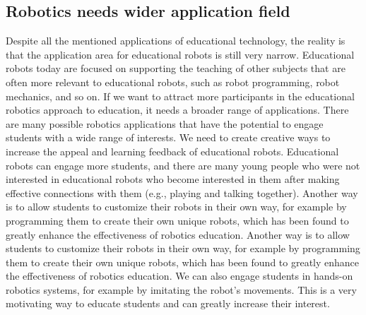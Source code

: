 \documentclass[a4paper,11pt]{article}
\begin{document}
\subsection{Robotics needs wider application field}
Despite all the mentioned applications of educational technology, the reality is that the application area for educational robots is still very narrow\cite{demo2012and}. Educational robots today are focused on supporting the teaching of other subjects that are often more relevant to educational robots, such as robot programming, robot mechanics, and so on. If we want to attract more participants in the educational robotics approach to education, it needs a broader range of applications. There are many possible robotics applications that have the potential to engage students with a wide range of interests. We need to create creative ways to increase the appeal and learning feedback of educational robots. Educational robots can engage more students, and there are many young people who were not interested in educational robots who become interested in them after making effective connections with them (e.g., playing and talking together). Another way is to allow students to customize their robots in their own way, for example by programming them to create their own unique robots, which has been found to greatly enhance the effectiveness of robotics education. Another way is to allow students to customize their robots in their own way, for example by programming them to create their own unique robots, which has been found to greatly enhance the effectiveness of robotics education. We can also engage students in hands-on robotics systems, for example by imitating the robot's movements. This is a very motivating way to educate students and can greatly increase their interest.
\end{document}
